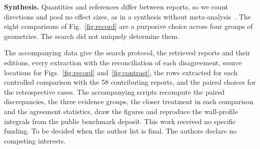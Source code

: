 \documentclass[pdflatex,sn-nature,iicol]{sn-jnl}
\begin{document}
\textbf{Synthesis.} Quantities and references differ between reports, so we count directions and pool no effect sizes, as in a synthesis without meta-analysis~\cite{Campbell2020}. The eight comparisons of Fig.~\ref{fig:record} are a purposive choice across four groups of geometries. The search did not uniquely determine them.

\backmatter
{}
The accompanying data give the search protocol, the retrieved reports and their editions, every extraction with the reconciliation of each disagreement, source locations for Figs.~\ref{fig:record} and~\ref{fig:contrast}, the rows extracted for each controlled comparison with the 58 contributing reports, and the paired choices for the retrospective cases.
The accompanying scripts recompute the paired discrepancies, the three evidence groups, the closer treatment in each comparison and the agreement statistics, draw the figures and reproduce the wall-profile integrals from the public benchmark deposit.
This work received no specific funding.
To be decided when the author list is final.
The authors declare no competing interests.

\end{document}
